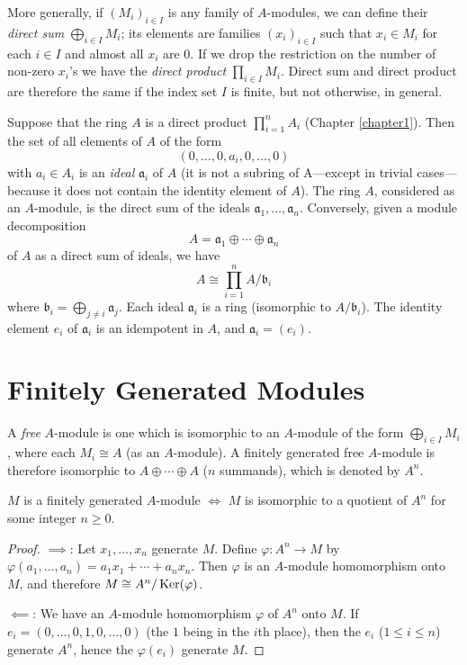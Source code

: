 More generally, if $(M_i)_{i \in I}$ is any family of $A$-modules, we can define their \emph{direct sum} $\bigoplus_{i \in I} M_i$; its elements are families $(x_i)_{i \in I}$ such that $x_i \in M_i$ for each $i \in I$ and almost all $x_i$ are $0$. If we drop the restriction on the number of non-zero $x_i$'s we have the \emph{direct product} $\prod_{i \in I} M_i$. Direct sum and direct product are therefore the same if the index set $I$ is finite, but not otherwise, in general.

Suppose that the ring $A$ is a direct product $\prod_{i=1}^n A_i$ (Chapter \ref{chapter1}). Then the set of all elements of $A$ of the form
\[
    (0, \ldots, 0, a_i, 0, \ldots, 0)
\]
with $a_i \in A_i$ is an \emph{ideal} $\mathfrak{a}_i$ of $A$ (it is not a subring of A---except in trivial cases---because it does not contain the identity element of $A$). The ring $A$, considered as an $A$-module, is the direct sum of the ideals $\mathfrak{a}_1, \ldots, \mathfrak{a}_n$. Conversely, given a module decomposition
\[
    A = \mathfrak{a}_1 \oplus \cdots \oplus \mathfrak{a}_n
\]
of $A$ as a direct sum of ideals, we have
\[
    A \cong \prod_{i=1}^n A/\mathfrak{b}_i
\]
where $\mathfrak{b}_i = \bigoplus_{j \neq i} \mathfrak{a}_j$. Each ideal $\mathfrak{a}_i$ is a ring (isomorphic to $A/\mathfrak{b}_i$). The identity element $e_i$ of $\mathfrak{a}_i$ is an idempotent in $A$, and $\mathfrak{a}_i = (e_i)$.

\section*{Finitely Generated Modules}

A \emph{free} $A$-module is one which is isomorphic to an $A$-module of the form $\bigoplus_{i \in I} M_i$, where each $M_i \cong A$ (as an $A$-module). A finitely generated free $A$-module is therefore isomorphic to $A \oplus \cdots \oplus A$ ($n$ summands), which is denoted by $A^n$.

\begin{proposition}\label{prop:finitely-generated-quotient}
$M$ is a finitely generated $A$-module $\iff$ $M$ is isomorphic to a quotient of $A^n$ for some integer $n \geq 0$.
\end{proposition}

\begin{proof}
    $\implies$: Let $x_1, \ldots, x_n$ generate $M$. Define $\varphi \colon A^n \to M$ by $\varphi(a_1, \ldots, a_n) = a_1 x_1 + \cdots + a_n x_n$. Then $\varphi$ is an $A$-module homomorphism onto $M$, and therefore $M \cong A^n/\operatorname{Ker}(\varphi)$.

    $\impliedby$: We have an $A$-module homomorphism $\varphi$ of $A^n$ onto $M$. If $e_i = (0, \ldots, 0, 1, 0, \ldots, 0)$ (the $1$ being in the $i$th place), then the $e_i$ ($1 \leq i \leq n$) generate $A^n$, hence the $\varphi(e_i)$ generate $M$.
\end{proof}

